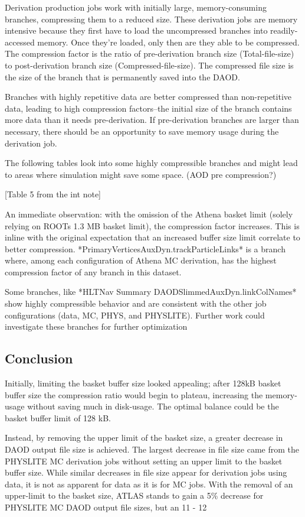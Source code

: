 Derivation production jobs work with initially large, memory-consuming branches, compressing them to a reduced size. These derivation jobs are memory intensive because they first have to load the uncompressed branches into readily-accessed memory. Once they're loaded, only then are they able to be compressed. The compression factor is the ratio of pre-derivation branch size (Total-file-size) to post-derivation branch size (Compressed-file-size). The compressed file size is the size of the branch that is permanently saved into the DAOD.  

Branches with highly repetitive data are better compressed than non-repetitive data, leading to high compression factors--the initial size of the branch contains more data than it needs pre-derivation. If pre-derivation branches are larger than necessary, there should be an opportunity to save memory usage during the derivation job. 

The following tables look into some highly compressible branches and might lead to areas where simulation might save some space. (AOD pre compression?)

[Table 5 from the int note]

An immediate observation: with the omission of the Athena basket limit (solely relying on ROOTs 1.3 MB basket limit), the compression factor increases. This is inline with the original expectation that an increased buffer size limit correlate to better compression. *PrimaryVerticesAuxDyn.trackParticleLinks* is a branch where, among each configuration of Athena MC derivation, has the highest compression factor of any branch in this dataset. 

Some branches, like *HLTNav Summary DAODSlimmedAuxDyn.linkColNames* show highly compressible behavior and are consistent with the other job configurations (data, MC, PHYS, and PHYSLITE). Further work could investigate these branches for further optimization 

\subsection{Conclusion}

Initially, limiting the basket buffer size looked appealing; after 128kB basket buffer size the compression ratio would begin to plateau, increasing the memory-usage without saving much in disk-usage. The optimal balance could be the basket buffer limit of 128 kB. 

Instead, by removing the upper limit of the basket size, a greater decrease in DAOD output file size is achieved. The largest decrease in file size came from the PHYSLITE MC derivation jobs without setting an upper limit to the basket buffer size. While similar decreases in file size appear for derivation jobs using data, it is not as apparent for data as it is for MC jobs. With the removal of an upper-limit to the basket size, ATLAS stands to gain a 5\% decrease for PHYSLITE MC DAOD output file sizes, but an 11 - 12%

